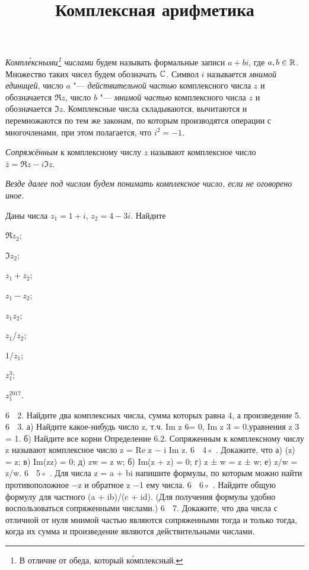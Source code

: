 \documentclass[a4paper, 12pt, num=21]{listok}
\begin{document}
\title{Комплексная арифметика}
\maketitle{}
\begin{definition}
	\textit{Компл\'ексными\footnote{В отличие от обеда, который к\'омплексный.} числами} будем называть формальные записи $a + b i$, где $a, b \in \mathbb{R}$.
	Множество таких чисел будем обозначать $\mathbb{C}$.
	Символ $i$ называется \textit{мнимой единицей}, число $a$ "--- \textit{действительной частью} комплексного числа $z$ и обозначается $\Re z$,
	число $b$ "--- \textit{мнимой частью} комплексного числа $z$ и обозначается $\Im z$.
	Комплексные числа складываются, вычитаются и перемножаются по тем же законам, по которым производятся операции с
	многочленами, при этом полагается, что $i^2 = -1$.	
\end{definition}
\begin{definition}
	\textit{Сопряжённым} к комплексному числу $z$ называют комплексное число $\bar{z} = \Re z - i \Im z$.
\end{definition}
\textit{Везде далее под числом будем понимать комплексное число, если не оговорено иное.}
\begin{problem}
Даны числа $z_1 = 1 + i$, $z_2 = 4 − 3i$.
Найдите
\begin{enumerate}
\begin{multicols}{5}
	\item $\Re z_2$;
	\item $\Im z_2$;
	\item $z_1 + z_2$;
	\item $z_1 - z_2$;
	\item $z_1z_2$;
	\item $z_1/z_2$;
	\item $1/z_1$;
	\item $z_1^3$;
	\item $z_1^{2017}$.
\end{multicols}
\end{enumerate}
\end{problem}
6  2. Найдите два комплексных числа, сумма которых равна 4, а произведение 5.
6  3. а) Найдите какое-нибудь число z, т.ч. Im z 6= 0, Im z 3 = 0.уравнения z 3 = 1.
б) Найдите все корни
Определение 6.2. Сопряженным к комплексному числу z называют комплексное число
z = Re z − i Im z.
6  4◦ . Докажите, что
а) (z) = z;
 в) Im(zz) = 0;
 д) zw = z w;
б) Im(z + z) = 0;
 г) z ± w = z ± w;
 е) z/w = z/w.
6  5◦
 . Для числа z = a + bi напишите формулы, по которым можно найти противоположное
−z и обратное z −1 ему числа.
6  6◦ . Найдите общую формулу для частного (a + ib)/(c + id). (Для получения формулы
удобно воспользоваться сопряженными числами.)
6  7. Докажите, что два числа с отличной от нуля мнимой частью являются сопряженными
тогда и только тогда, когда их сумма и произведение являются действительными числами.
\end{document}
